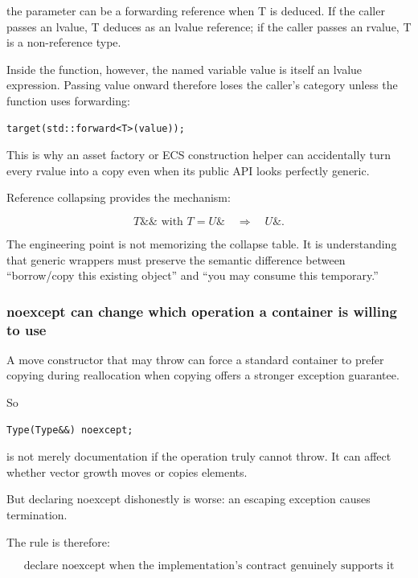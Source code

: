 the parameter can be a forwarding reference when T is deduced. If the caller passes an lvalue, T deduces as an lvalue reference; if the caller passes an rvalue, T is a non-reference type.

Inside the function, however, the named variable value is itself an lvalue expression. Passing value onward therefore loses the caller's category unless the function uses forwarding:

\begin{verbatim}
target(std::forward<T>(value));
\end{verbatim}

This is why an asset factory or ECS construction helper can accidentally turn every rvalue into a copy even when its public API looks perfectly generic.

Reference collapsing provides the mechanism:

\[
T\&\& \text{ with } T=U\&
\quad\Rightarrow\quad
U\&.
\]

The engineering point is not memorizing the collapse table. It is understanding that generic wrappers must preserve the semantic difference between ``borrow/copy this existing object'' and ``you may consume this temporary.''

\subsubsection{noexcept can change which operation a container is willing to use}\label{01-foundations-i-ch005-noexcept-can-change-which-operation-a-container-is-willing-to-use}

\hypertarget{01-foundations-i-ch005-noexcept-can-change-which-operation-a-container-is-willing-to-use}{}

A move constructor that may throw can force a standard container to prefer copying during reallocation when copying offers a stronger exception guarantee.

So

\begin{verbatim}
Type(Type&&) noexcept;
\end{verbatim}

is not merely documentation if the operation truly cannot throw. It can affect whether vector growth moves or copies elements.

But declaring noexcept dishonestly is worse: an escaping exception causes termination.

The rule is therefore:

\[
\boxed{
\text{declare noexcept when the implementation's contract genuinely supports it}
}
\]

